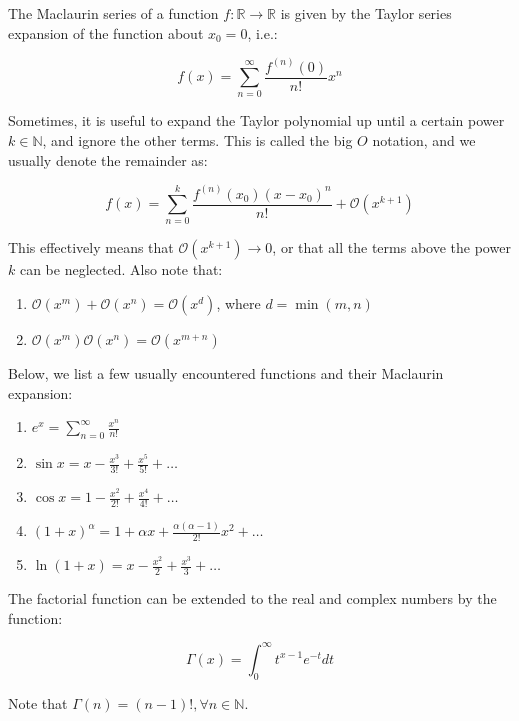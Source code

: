 \documentclass[12pt]{article}
\begin{document}
\begin{definition}
    The Maclaurin series of a function $f : \mathbb{R} \to \mathbb{R}$ is given by the Taylor series expansion of the function about $x_0 = 0$, i.e.:

    \[ f(x) = \sum_{n = 0}^\infty \frac{f^{(n)}(0)}{n!}x^n \]
\end{definition}

Sometimes, it is useful to expand the Taylor polynomial up until a certain power $k \in \mathbb{N}$, and ignore the other terms. This is called the big $O$ notation, and we usually denote the remainder as:

\[ f(x) =  \sum_{n = 0}^k \frac{f^{(n)}(x_0)(x - x_0)^n}{n!} + \mathcal{O}(x^{k + 1}) \]

This effectively means that $\mathcal{O}(x^{k+1}) \to 0$, or that all the terms above the power $k$ can be neglected. Also note that:

\begin{enumerate}
    \item $\mathcal{O}(x^m) + \mathcal{O}(x^n) = \mathcal{O}(x^d)$, where $d = \min{(m, n)}$
    \item $\mathcal{O}(x^m)\mathcal{O}(x^n) = \mathcal{O}(x^{m + n})$
\end{enumerate}

\begin{example}
    Below, we list a few usually encountered functions and their Maclaurin expansion:

    \begin{enumerate}
        \item $e^x = \sum_{n = 0}^\infty \frac{x^n}{n!}$
        \item $\sin{x} = x - \frac{x^3}{3!} + \frac{x^5}{5!} + \dots$
        \item $\cos{x} = 1 - \frac{x^2}{2!} + \frac{x^4}{4!} + \dots$
        \item $(1 + x)^\alpha = 1 + \alpha x + \frac{\alpha (\alpha - 1)}{2!}x^2 + \dots$
        \item $\ln{(1 + x)} = x - \frac{x^2}{2} + \frac{x^3}{3} + \dots$
    \end{enumerate}
\end{example}

\begin{proposition}
    The factorial function can be extended to the real and complex numbers by the function:

    \[ \Gamma(x) = \int_0^\infty t^{x-1}e^{-t}dt \]

    Note that $\Gamma(n) = (n-1)!, \forall n \in \mathbb{N}$.
\end{proposition}
\end{document}
